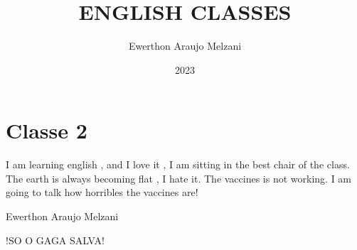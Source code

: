 \documentclass{article}
\title{ENGLISH CLASSES}
\author{Ewerthon Araujo Melzani}
\date{2023}
\begin{document}
\maketitle

\section*{Classe 2}

\vspace*{1.5 cm}


I am learning english , and I love it , I am sitting in the best chair of the class.
The earth is always becoming flat , I hate it. The vaccines is not working.
I am going to talk how horribles the vaccines are!






\vspace*{1.5 cm}



\LARGE{Ewerthon Araujo Melzani}

\vspace*{1.5 cm}

\huge{!SO O GAGA SALVA!}
\end{document}
